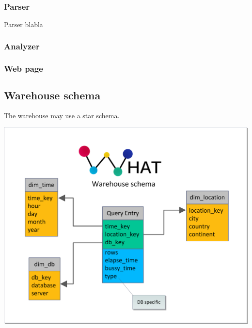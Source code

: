 \subsubsection{Parser}
Parser blabla
\subsubsection{Analyzer}
\subsubsection{Web page}

\subsection{Warehouse schema}\label{WHschema}
The warehouse may use a star schema.
\begin{center}
\includegraphics[width=1\linewidth]{Pictures/WareHouseSchema.png}
\end{center}   
